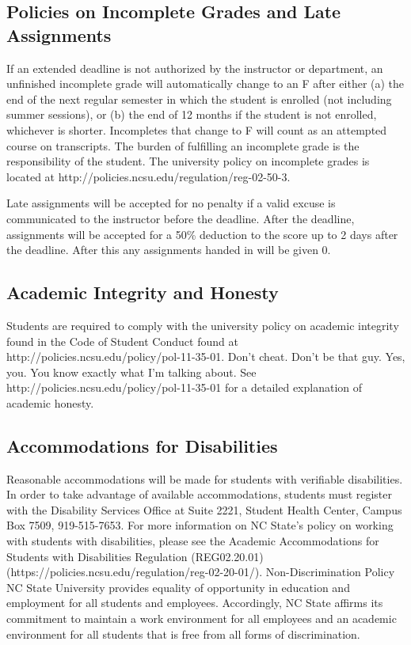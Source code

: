 \subsection*{Policies on Incomplete Grades and Late Assignments}
\footnotesize{If an extended deadline is not authorized by the instructor or department, an unfinished incomplete grade will automatically change to an F after either (a) the end of the next regular semester in which the student is enrolled (not including summer sessions), or (b) the end of 12 months if the student is not enrolled, whichever is shorter. Incompletes that change to F will count as an attempted course on transcripts. The burden of fulfilling an incomplete grade is the responsibility of the student. The university policy on incomplete grades is located at http://policies.ncsu.edu/regulation/reg-02-50-3.}

\footnotesize{Late assignments will be accepted for no penalty if a valid excuse is communicated to the instructor before the deadline. After the deadline, assignments will be accepted for a 50\% deduction to the score up to 2 days after the deadline. After this any assignments handed in will be given 0.}

\subsection*{Academic Integrity and Honesty}
\footnotesize{Students are required to comply with the university policy on academic integrity found in the Code of Student Conduct found at http://policies.ncsu.edu/policy/pol-11-35-01. Don't cheat. Don't be that guy. Yes, you. You know exactly what I'm talking about. See http://policies.ncsu.edu/policy/pol-11-35-01 for a detailed explanation of academic honesty.}

\subsection*{Accommodations for Disabilities}
\footnotesize{Reasonable accommodations will be made for students with verifiable disabilities. In order to take advantage of available accommodations, students must register with the Disability Services Office at Suite 2221, Student Health Center, Campus Box 7509, 919-515-7653. For more information on NC State's policy on working with students with disabilities, please see the Academic Accommodations for Students with Disabilities Regulation (REG02.20.01) (https://policies.ncsu.edu/regulation/reg-02-20-01/).
Non-Discrimination Policy NC State University provides equality of opportunity in education and employment for all students and employees. Accordingly, NC State affirms its commitment to maintain a work environment for all employees and an academic environment for all students that is free from all forms of discrimination.}

